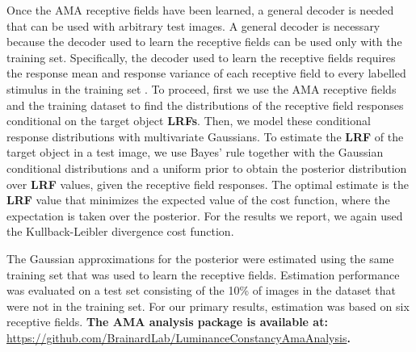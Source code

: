 \documentclass{jov}
\providecommand{\DIFaddtex}[1]{{\bf #1}} %
\providecommand{\DIFdeltex}[1]{} %
\providecommand{\DIFaddbegin}{} %
\providecommand{\DIFaddend}{} %
\providecommand{\DIFdelbegin}{} %
\providecommand{\DIFdelend}{} %
\providecommand{\DIFadd}[1]{\texorpdfstring{\DIFaddtex{#1}}{#1}} %
\providecommand{\DIFdel}[1]{\texorpdfstring{\DIFdeltex{#1}}{}} %
\newcommand{\DIFscaledelfig}{0.5}
\newlength{\DIFdelgraphicswidth} %
\newlength{\DIFdelgraphicsheight} %
\newcommand{\DIFaddincludegraphics}[2][]{{\color{blue}\fbox{\DIFOincludegraphics[#1]{#2}}}} %
\newcommand{\DIFdelincludegraphics}[2][]{%
\sbox{\DIFdelgraphicsbox}{\DIFOincludegraphics[#1]{#2}}%
\settoboxwidth{\DIFdelgraphicswidth}{\DIFdelgraphicsbox} %
\settoboxtotalheight{\DIFdelgraphicsheight}{\DIFdelgraphicsbox} %
\scalebox{\DIFscaledelfig}{%
\parbox[b]{\DIFdelgraphicswidth}{\usebox{\DIFdelgraphicsbox}\\[-\baselineskip] \rule{\DIFdelgraphicswidth}{0em}}\llap{\resizebox{\DIFdelgraphicswidth}{\DIFdelgraphicsheight}{%
\setlength{\unitlength}{\DIFdelgraphicswidth}%
\begin{picture}(1,1)%
\thicklines\linethickness{2pt} %
{\color[rgb]{1,0,0}\put(0,0){\framebox(1,1){}}}%
{\color[rgb]{1,0,0}\put(0,0){\line( 1,1){1}}}%
{\color[rgb]{1,0,0}\put(0,1){\line(1,-1){1}}}%
\end{picture}%
}\hspace*{3pt}}} %
} %
\DeclareRobustCommand{\DIFaddbegin}{\DIFOaddbegin \let\includegraphics\DIFaddincludegraphics} %
\DeclareRobustCommand{\DIFaddend}{\DIFOaddend \let\includegraphics\DIFOincludegraphics} %
\DeclareRobustCommand{\DIFdelbegin}{\DIFOdelbegin \let\includegraphics\DIFdelincludegraphics} %
\DeclareRobustCommand{\DIFdelend}{\DIFOaddend \let\includegraphics\DIFOincludegraphics} %
\begin{document}
Once the AMA receptive fields have been learned, a general decoder is needed that can be used with arbitrary test images.
A general decoder is necessary because the decoder used to learn the receptive fields can be used only with the training set. Specifically, the decoder used to learn the receptive fields requires the response mean and response variance of each receptive field to every labelled stimulus in the training set \cite{geisler2009optimal,burge2017accuracy}.
To proceed, first we use the AMA receptive fields and the training dataset to find the distributions of the receptive field responses conditional on the target object \DIFdelbegin \DIFdel{LRVs}\DIFdelend \DIFaddbegin \DIFadd{LRFs}\DIFaddend .
Then, we model these conditional response distributions with multivariate Gaussians.
To estimate the \DIFdelbegin \DIFdel{LRV }\DIFdelend \DIFaddbegin \DIFadd{LRF }\DIFaddend of the target object in a test image, we use Bayes' rule together with the Gaussian conditional distributions and a uniform prior to obtain the posterior distribution over \DIFdelbegin \DIFdel{LRV }\DIFdelend \DIFaddbegin \DIFadd{LRF }\DIFaddend values, given the receptive field responses.
The optimal estimate is the \DIFdelbegin \DIFdel{LRV }\DIFdelend \DIFaddbegin \DIFadd{LRF }\DIFaddend value that minimizes the expected value of the cost function, where the expectation is taken over the posterior.
For the results we report, we again used the Kullback-Leibler divergence cost function.

The Gaussian approximations for the posterior were estimated using the same training set that was used to learn the receptive fields.
Estimation performance was evaluated on a test set consisting of the 10\% of images in the dataset that were not in the training set.
For our primary results, estimation was based on six receptive fields.
\DIFaddbegin \DIFadd{The AMA analysis package is available at: }\href{https://github.com/BrainardLab/LuminanceConstancyAmaAnalysis}{https://github.com/BrainardLab/LuminanceConstancyAmaAnalysis}\DIFadd{.
}\DIFaddend 
\end{document}
